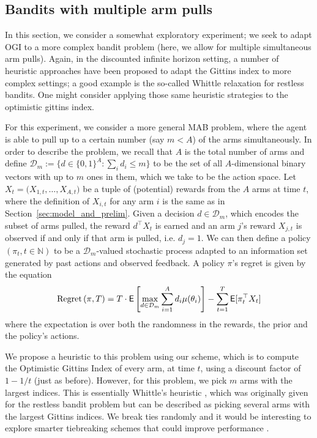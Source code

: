 \subsection{Bandits with multiple arm pulls}

In this section, we consider a somewhat exploratory experiment; we seek to adapt OGI to a more complex bandit problem (here, we allow for multiple simultaneous arm pulls). Again, in the discounted infinite horizon setting, a number of heuristic approaches have been proposed to adapt the Gittins index to more complex settings; a good example is the so-called Whittle relaxation for restless bandits. One might consider applying those same heuristic strategies to the optimistic gittins index. 

For this experiment, we consider a more general MAB problem, where the agent is able to pull up to a certain number (say $m < A$) of the arms simultaneously. In order to describe the problem, we recall that $A$ is the total number of arms and define  $\mathcal{D}_m := \{d \in \{0,1\}^A : \sum_i d_i \le m\}$ to be the set of all $A$-dimensional binary vectors with up to $m$ ones in them, which we take to be the action space. Let $X_t = (X_{1,t}, \ldots, {X_{A,t})}$ be a tuple of (potential) rewards from the $A$ arms at time $t$, where the definition of $X_{i,t}$ for any arm $i$ is the same as in Section~\ref{sec:model_and_prelim}. Given a decision $d \in \mathcal D_m$, which encodes the subset of arms pulled, the reward $d^\top X_t$ is earned and an arm $j$'s reward $X_{j,t}$ is observed if and only if that arm is pulled, i.e. $d_{j} = 1$. We can then define a policy $(\pi_t, t \in \mathbb{N})$ to be a $\mathcal{D}_m$-valued stochastic process adapted to an information set generated by past actions and observed feedback. 
 A policy $\pi$'s regret is given by the equation 
\[
\textnormal{Regret} \left( \pi, T \right) = T \cdot  \mathsf{E} \left[ \max_{d \in \mathcal D_m}   \sum_{i=1}^A d_i \mu(\theta_i) \right] - \sum_{t=1}^T \mathsf{E}[\pi_t^\top X_t ]
\]
where the expectation is over both the randomness in the rewards, the prior and the policy's actions.

We propose a heuristic to this problem using our scheme, which is to compute the Optimistic Gittins Index of every arm, at time $t$, using a discount factor of $1-1/t$ (just as before). However, for this problem, we pick $m$ arms with the largest indices. This is essentially Whittle's heuristic \citep{whittle1988restless}, which was originally given for the restless bandit problem but can be described as picking several arms with the largest Gittins indices. {We break ties randomly and it would be interesting to explore smarter tiebreaking schemes that could improve performance \citep{brown2017index}}.

